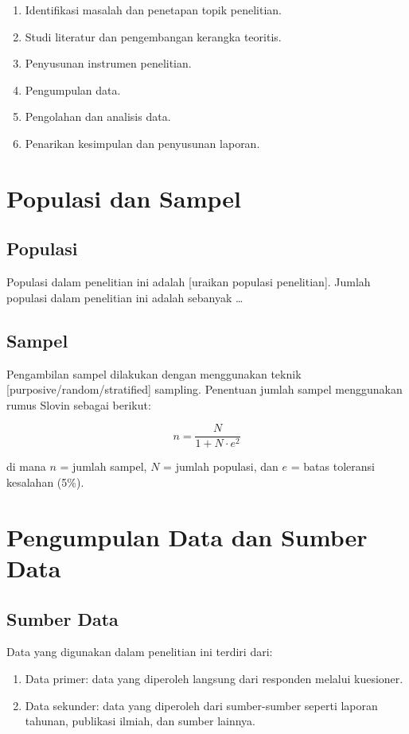 \begin{enumerate}
  \item Identifikasi masalah dan penetapan topik penelitian.
  \item Studi literatur dan pengembangan kerangka teoritis.
  \item Penyusunan instrumen penelitian.
  \item Pengumpulan data.
  \item Pengolahan dan analisis data.
  \item Penarikan kesimpulan dan penyusunan laporan.
\end{enumerate}

\section{Populasi dan Sampel}
\label{sec:populasi-sampel}

\subsection{Populasi}
\label{subsec:populasi}

Populasi dalam penelitian ini adalah [uraikan populasi penelitian]. Jumlah populasi
dalam penelitian ini adalah sebanyak \ldots

\subsection{Sampel}
\label{subsec:sampel}

Pengambilan sampel dilakukan dengan menggunakan teknik [purposive/random/stratified]
sampling. Penentuan jumlah sampel menggunakan rumus Slovin sebagai berikut:

\begin{equation}
n = \frac{N}{1 + N \cdot e^2}
\label{eq:slovin}
\end{equation}

\noindent
di mana $n$ = jumlah sampel, $N$ = jumlah populasi, dan $e$ = batas toleransi
kesalahan (5\%).

\section{Pengumpulan Data dan Sumber Data}
\label{sec:pengumpulan-data}

\subsection{Sumber Data}
Data yang digunakan dalam penelitian ini terdiri dari:
\begin{enumerate}
  \item Data primer: data yang diperoleh langsung dari responden melalui kuesioner.
  \item Data sekunder: data yang diperoleh dari sumber-sumber seperti laporan tahunan,
        publikasi ilmiah, dan sumber lainnya.
\end{enumerate}

